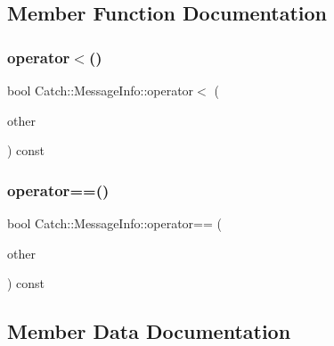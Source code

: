 \subsection{Member Function Documentation}
\hypertarget{struct_catch_1_1_message_info_a8254cb8fca2da02a29a9843cdcb79df1}{}\label{struct_catch_1_1_message_info_a8254cb8fca2da02a29a9843cdcb79df1} 
\subsubsection{\texorpdfstring{operator$<$()}{operator<()}}
{\footnotesize\ttfamily bool Catch\+::\+Message\+Info\+::operator$<$ (\begin{DoxyParamCaption}\item[{\hyperlink{struct_catch_1_1_message_info}{Message\+Info} const \&}]{other }\end{DoxyParamCaption}) const\hspace{0.3cm}{\ttfamily [inline]}}

\hypertarget{struct_catch_1_1_message_info_af4b37f2172ba55395813b4bb6bbbde1a}{}\label{struct_catch_1_1_message_info_af4b37f2172ba55395813b4bb6bbbde1a} 
\subsubsection{\texorpdfstring{operator==()}{operator==()}}
{\footnotesize\ttfamily bool Catch\+::\+Message\+Info\+::operator== (\begin{DoxyParamCaption}\item[{\hyperlink{struct_catch_1_1_message_info}{Message\+Info} const \&}]{other }\end{DoxyParamCaption}) const\hspace{0.3cm}{\ttfamily [inline]}}



\subsection{Member Data Documentation}
\hypertarget{struct_catch_1_1_message_info_a985165328723e599696ebd8e43195cc5}{}\label{struct_catch_1_1_message_info_a985165328723e599696ebd8e43195cc5} 
